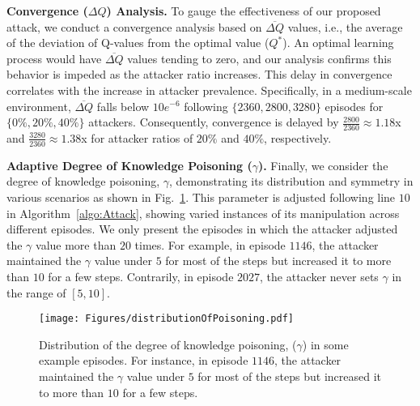 \textbf{Convergence ($\Delta Q$) Analysis.} 
To gauge the effectiveness of our proposed attack, we conduct a convergence analysis based on $\overline{\Delta Q}$ values, i.e., the average of the deviation of Q-values from the optimal value ($Q^*$). An optimal learning process would have $\overline{\Delta Q}$ values tending to zero, and our analysis confirms this behavior is impeded as the attacker ratio increases. This delay in convergence correlates with the increase in attacker prevalence. Specifically, in a medium-scale environment, $\overline{\Delta Q}$ falls below $10e^{-6}$ following $\{2360, 2800, 3280\}$ episodes for $\{0\%, 20\%, 40\%\}$ attackers. Consequently, convergence is delayed by $\frac{2800}{2360}\approx 1.18$x and $\frac{3280}{2360}\approx 1.38$x for attacker ratios of $20\%$ and $40\%$, respectively.

\textbf{Adaptive Degree of Knowledge Poisoning ($\gamma$).}
\label{degreeOfPoisoning}
Finally, we consider the degree of knowledge poisoning, $\gamma$, demonstrating its distribution and symmetry in various scenarios as shown in Fig.~\ref{fig:degree}. This parameter is adjusted following line $10$ in Algorithm~\ref{algo:Attack}, showing varied instances of its manipulation across different episodes. We only present the episodes in which the attacker adjusted the $\gamma$ value more than $20$ times. For example, in episode $1146$, the attacker maintained the $\gamma$ value under $5$ for most of the steps but increased it to more than $10$ for a few steps. Contrarily, in episode $2027$, the attacker never sets $\gamma$ in the range of $\left[5,10\right]$.

\begin{figure}[!t]
\centerline{\texttt{[image: Figures/distributionOfPoisoning.pdf]}}
\caption{\small Distribution of the degree of knowledge poisoning, ($\gamma$) in some example episodes. For instance, in episode $1146$, the attacker maintained the $\gamma$ value under $5$ for most of the steps but increased it to more than $10$ for a few steps.}
\label{fig:degree}
\end{figure}


